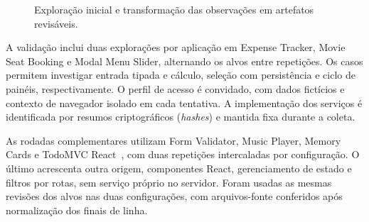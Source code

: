\documentclass[12pt]{article}
\begin{document}
\begin{figure}[ht]
\centering
{}
\caption{Exploração inicial e transformação das observações em artefatos revisáveis.}
\label{fig:pipeline}
\end{figure}

A validação inclui duas explorações por aplicação em Expense Tracker, Movie Seat Booking e Modal Menu Slider, alternando os alvos entre repetições. Os casos permitem investigar entrada tipada e cálculo, seleção com persistência e ciclo de painéis, respectivamente. O perfil de acesso é convidado, com dados fictícios e contexto de navegador isolado em cada tentativa. A implementação dos serviços é identificada por resumos criptográficos (\textit{hashes}) e mantida fixa durante a coleta.

As rodadas complementares utilizam Form Validator, Music Player, Memory Cards e TodoMVC React~\cite{tastejs2026todomvc}, com duas repetições intercaladas por configuração. O último acrescenta outra origem, componentes React, gerenciamento de estado e filtros por rotas, sem serviço próprio no servidor. Foram usadas as mesmas revisões dos alvos nas duas configurações, com arquivos-fonte conferidos após normalização dos finais de linha.
\end{document}
